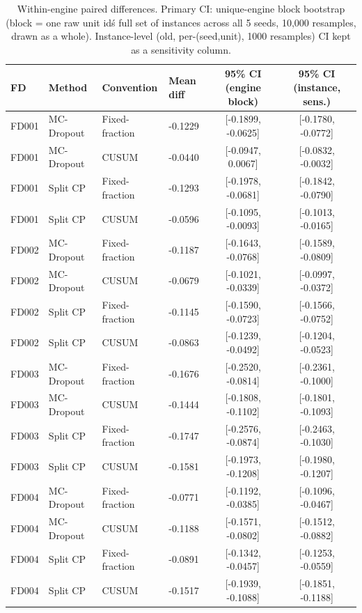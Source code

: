 \begin{table}[t]
\caption{Within-engine paired differences. Primary CI: unique-engine block bootstrap (block = one raw unit id\'s full set of instances across all 5 seeds, 10{,}000 resamples, drawn as a whole). Instance-level (old, per-(seed,unit), 1000 resamples) CI kept as a sensitivity column.}
\label{tab:paired-diff-v4}
\centering
\small
\begin{tabular}{llllcc}
\toprule
FD & Method & Convention & Mean diff & 95\% CI (engine block) & 95\% CI (instance, sens.) \\
\midrule
FD001 & MC-Dropout & Fixed-fraction & -0.1229 & [-0.1899, -0.0625] & [-0.1780, -0.0772] \\
FD001 & MC-Dropout & CUSUM & -0.0440 & [-0.0947, 0.0067] & [-0.0832, -0.0032] \\
FD001 & Split CP & Fixed-fraction & -0.1293 & [-0.1978, -0.0681] & [-0.1842, -0.0790] \\
FD001 & Split CP & CUSUM & -0.0596 & [-0.1095, -0.0093] & [-0.1013, -0.0165] \\
FD002 & MC-Dropout & Fixed-fraction & -0.1187 & [-0.1643, -0.0768] & [-0.1589, -0.0809] \\
FD002 & MC-Dropout & CUSUM & -0.0679 & [-0.1021, -0.0339] & [-0.0997, -0.0372] \\
FD002 & Split CP & Fixed-fraction & -0.1145 & [-0.1590, -0.0723] & [-0.1566, -0.0752] \\
FD002 & Split CP & CUSUM & -0.0863 & [-0.1239, -0.0492] & [-0.1204, -0.0523] \\
FD003 & MC-Dropout & Fixed-fraction & -0.1676 & [-0.2520, -0.0814] & [-0.2361, -0.1000] \\
FD003 & MC-Dropout & CUSUM & -0.1444 & [-0.1808, -0.1102] & [-0.1801, -0.1093] \\
FD003 & Split CP & Fixed-fraction & -0.1747 & [-0.2576, -0.0874] & [-0.2463, -0.1030] \\
FD003 & Split CP & CUSUM & -0.1581 & [-0.1973, -0.1208] & [-0.1980, -0.1207] \\
FD004 & MC-Dropout & Fixed-fraction & -0.0771 & [-0.1192, -0.0385] & [-0.1096, -0.0467] \\
FD004 & MC-Dropout & CUSUM & -0.1188 & [-0.1571, -0.0802] & [-0.1512, -0.0882] \\
FD004 & Split CP & Fixed-fraction & -0.0891 & [-0.1342, -0.0457] & [-0.1253, -0.0559] \\
FD004 & Split CP & CUSUM & -0.1517 & [-0.1939, -0.1088] & [-0.1851, -0.1188] \\
\bottomrule
\end{tabular}
\end{table}

